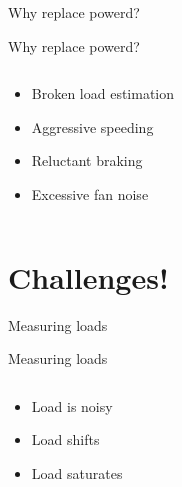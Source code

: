 \documentclass[aspectratio=169]{beamer}
\begin{document}
\begin{frame}{Why replace powerd?}
\centering
{}
\end{frame}

\begin{frame}{Why replace powerd?}
\begin{columns}[onlytextwidth]
\begin{column}{0.4\textwidth}
\begin{itemize}
\item<1-> Broken load estimation
\item<2-> Aggressive speeding
\item<3-> Reluctant braking
\item<4-> Excessive fan noise
\end{itemize}
\end{column}
\begin{column}{0.6\textwidth}
\begin{tikzpicture}[scale=.6]


\end{tikzpicture}
\end{column}
\end{columns}
\end{frame}

\section{Challenges!}

\begin{frame}{Measuring loads}
\centering
\begin{tikzpicture}

\end{tikzpicture}
\end{frame}

\begin{frame}{Measuring loads}
\begin{columns}[onlytextwidth]
\begin{column}{0.4\textwidth}
\begin{itemize}
\item<1-> Load is noisy
\item<2-> Load shifts
\item<3-> Load saturates
\end{itemize}
\end{column}
\begin{column}{0.6\textwidth}
\begin{tikzpicture}[scale=.6]

\end{tikzpicture}
\end{column}
\end{columns}
\end{frame}
\end{document}

